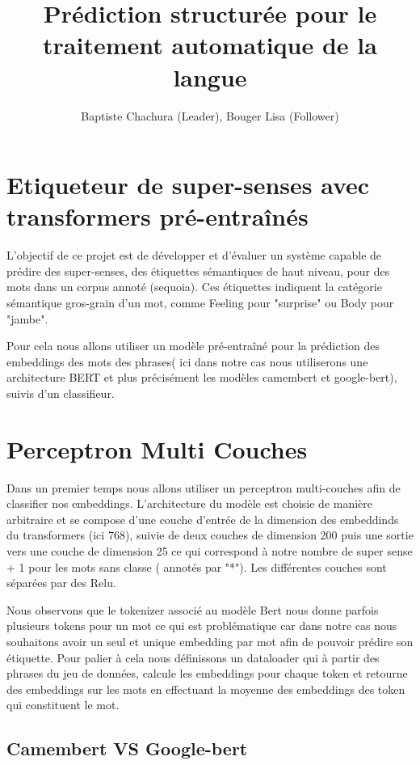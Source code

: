 \documentclass[12pt]{article}
\title{Prédiction structurée pour le traitement automatique de la langue}
\author{Baptiste Chachura (Leader), Bouger Lisa (Follower)}
\begin{document}
\maketitle
\vspace{-0.2in} %

\tableofcontents
\newpage

\section{Etiqueteur de super-senses avec transformers pré-entraînés}
L’objectif de ce projet est de développer et d’évaluer un système capable de prédire des super-senses, des étiquettes sémantiques 
de haut niveau, pour des mots dans un corpus annoté (sequoia). Ces étiquettes indiquent la catégorie sémantique gros-grain d’un mot,
comme Feeling pour "surprise" ou Body pour "jambe".

Pour cela nous allons utiliser un modèle pré-entraîné pour la prédiction des embeddings des mots des phrases( ici dans notre cas 
nous utiliserons une architecture BERT et plus précisément les modèles camembert et google-bert), suivis d'un classifieur.

\section{Perceptron Multi Couches}
Dans un premier temps nous allons utiliser un perceptron multi-couches afin de classifier nos embeddings. L'architecture du modèle est choisie
de manière arbitraire et se compose d'une couche d'entrée de la dimension des embeddinds du transformers (ici 768), suivie de deux couches 
de dimension 200 puis une sortie vers une couche de dimension 25 ce qui correspond à notre nombre de super sense + 1 pour les mots sans classe ( annotés par "*"). 
Les différentes couches sont séparées par des Relu.

Nous observons que le tokenizer associé au modèle Bert nous donne parfois plusieurs tokens pour un mot ce qui est problématique car 
dans notre cas nous souhaitons avoir un seul et unique embedding par mot afin de pouvoir prédire son étiquette. Pour palier à cela nous
définissons un dataloader qui à partir des phrases du jeu de données, calcule les embeddings pour chaque token et retourne des embeddings sur les mots en effectuant la 
moyenne des embeddings des token qui constituent le mot.
\subsection{Camembert VS Google-bert}
\end{document}
